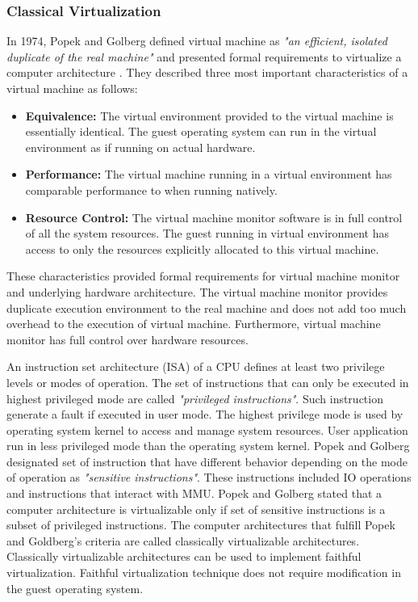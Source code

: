\subsubsection{Classical Virtualization}
In 1974, Popek and Golberg defined virtual machine as \emph{"an efficient, isolated duplicate of the real machine"} and presented formal requirements to virtualize a computer architecture \cite{popek1974formal}. They described three most important characteristics of a virtual machine as follows:

\begin {itemize}
	\item {\textbf{Equivalence:}} The virtual environment provided to the virtual machine is essentially identical. The guest operating system can run in the virtual environment as if running on actual hardware.
	\item {\textbf{Performance:}} The virtual machine running in a virtual environment has comparable performance to when running natively.
	\item {\textbf{Resource Control:}} The virtual machine monitor software is in full control of all the system resources. The guest running in virtual environment has access to only the resources explicitly allocated to this virtual machine.
\end {itemize}

These characteristics provided formal requirements for virtual machine monitor and underlying hardware architecture.
The virtual machine monitor provides duplicate execution environment to the real machine and does not add too much overhead to the execution of virtual machine.
Furthermore, virtual machine monitor has full control over hardware resources.

An instruction set architecture (ISA) of a CPU defines at least two privilege levels or modes of operation.
The set of instructions that can only be executed in highest privileged mode are called \emph{"privileged instructions"}.
Such instruction generate a fault if executed in user mode.
The highest privilege mode is used by operating system kernel to access and manage system resources.
User application run in less privileged mode than the operating system kernel.
Popek and Golberg designated set of instruction that have different behavior depending on the mode of operation as \emph{"sensitive instructions"}.
These instructions included IO operations and instructions that interact with MMU.
Popek and Golberg stated that a computer architecture is virtualizable only if set of sensitive instructions is a subset of privileged instructions. 
The computer architectures that fulfill Popek and Goldberg's criteria are called classically virtualizable architectures.
Classically virtualizable architectures can be used to implement faithful virtualization.
Faithful virtualization technique does not require modification in the guest operating system.

